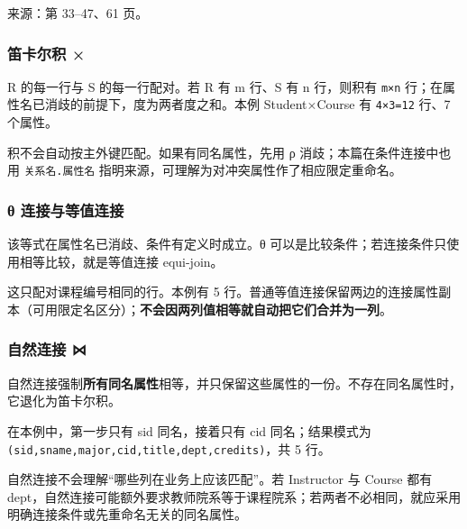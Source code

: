 来源：第 33--47、61 页。

\subsubsection{笛卡尔积 ×}\label{05_relational_algebra_zh-ux7b1bux5361ux5c14ux79ef}

R 的每一行与 S 的每一行配对。若 R 有 m 行、S 有 n 行，则积有 \texttt{m×n} 行；在属性名已消歧的前提下，度为两者度之和。本例 Student×Course 有 \texttt{4×3=12} 行、7 个属性。

积不会自动按主外键匹配。如果有同名属性，先用 ρ 消歧；本篇在条件连接中也用 \texttt{关系名.\allowbreak{}属性名} 指明来源，可理解为对冲突属性作了相应限定重命名。

\subsubsection{θ 连接与等值连接}\label{05_relational_algebra_zh-ux3b8-ux8fdeux63a5ux4e0eux7b49ux503cux8fdeux63a5}


该等式在属性名已消歧、条件有定义时成立。θ 可以是比较条件；若连接条件只使用相等比较，就是等值连接 equi-join。


这只配对课程编号相同的行。本例有 5 行。普通等值连接保留两边的连接属性副本（可用限定名区分）；\textbf{不会因两列值相等就自动把它们合并为一列}。

\subsubsection{自然连接 ⋈}\label{05_relational_algebra_zh-ux81eaux7136ux8fdeux63a5}

自然连接强制\textbf{所有同名属性}相等，并只保留这些属性的一份。不存在同名属性时，它退化为笛卡尔积。


在本例中，第一步只有 sid 同名，接着只有 cid 同名；结果模式为 \texttt{(\allowbreak{}sid,\allowbreak{}sname,\allowbreak{}major,\allowbreak{}cid,\allowbreak{}title,\allowbreak{}dept,\allowbreak{}credits)\allowbreak{}}，共 5 行。

自然连接不会理解``哪些列在业务上应该匹配''。若 Instructor 与 Course 都有 dept，自然连接可能额外要求教师院系等于课程院系；若两者不必相同，就应采用明确连接条件或先重命名无关的同名属性。


